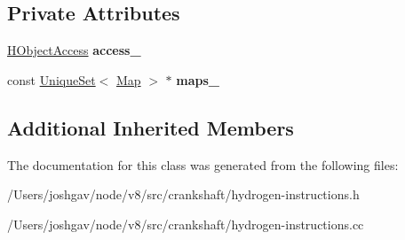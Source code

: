 \subsection*{Private Attributes}
\begin{DoxyCompactItemize}
\item 
\hyperlink{classv8_1_1internal_1_1_h_object_access}{H\+Object\+Access} {\bfseries access\+\_\+}\hypertarget{classv8_1_1internal_1_1_h_load_named_field_a5b85f99209b90d0efecc07a4b46f98ac}{}\label{classv8_1_1internal_1_1_h_load_named_field_a5b85f99209b90d0efecc07a4b46f98ac}

\item 
const \hyperlink{classv8_1_1internal_1_1_unique_set}{Unique\+Set}$<$ \hyperlink{classv8_1_1internal_1_1_map}{Map} $>$ $\ast$ {\bfseries maps\+\_\+}\hypertarget{classv8_1_1internal_1_1_h_load_named_field_acfe99ea6c9f7606cbb8690e2e307a7d3}{}\label{classv8_1_1internal_1_1_h_load_named_field_acfe99ea6c9f7606cbb8690e2e307a7d3}

\end{DoxyCompactItemize}
\subsection*{Additional Inherited Members}


The documentation for this class was generated from the following files\+:\begin{DoxyCompactItemize}
\item 
/\+Users/joshgav/node/v8/src/crankshaft/hydrogen-\/instructions.\+h\item 
/\+Users/joshgav/node/v8/src/crankshaft/hydrogen-\/instructions.\+cc\end{DoxyCompactItemize}

